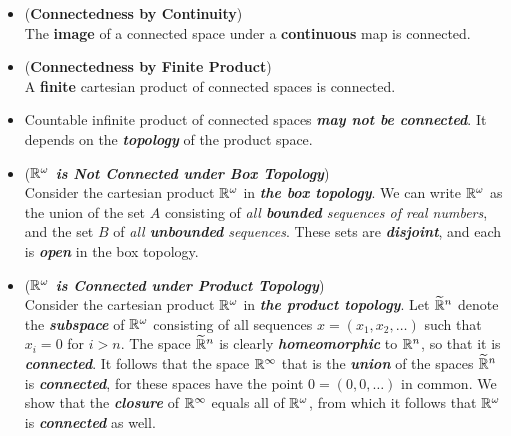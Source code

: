 \documentclass[11pt]{article}
\begin{document}
\begin{itemize}
\item \begin{proposition}  (\textbf{Connectedness by Continuity}) \citep{munkres2000topology} \\
The \textbf{image} of a connected space under a \textbf{continuous} map is connected.
\end{proposition}

\item \begin{proposition}  (\textbf{Connectedness by Finite Product}) \citep{munkres2000topology} \\
A \textbf{finite} cartesian product of connected spaces is connected.
\end{proposition}

\item \begin{remark}
Countable infinite product of connected spaces \emph{\textbf{may not be connected}}. It depends on the \emph{\textbf{topology}} of the product space.
\end{remark}

\item \begin{example} (\emph{\textbf{${\mathbb R}^{\omega}$ is Not Connected under Box Topology}})\\
Consider the cartesian product ${\mathbb R}^{\omega}$ in \emph{\textbf{the box topology}}. We can write ${\mathbb R}^{\omega}$ as the union of the set $A$ consisting of \emph{all \textbf{bounded} sequences of real numbers}, and the set $B$ of \emph{all \textbf{unbounded} sequences}. These sets are \emph{\textbf{disjoint}}, and each is \emph{\textbf{open}} in the box topology.
\end{example}

\item \begin{example} (\emph{\textbf{${\mathbb R}^{\omega}$ is  Connected under Product Topology}})\\
Consider the cartesian product ${\mathbb R}^{\omega}$ in \emph{\textbf{the product topology}}. Let $\widetilde{{\mathbb R}}^n$ denote the \emph{\textbf{subspace}} of ${\mathbb R}^{\omega}$ consisting of all sequences $x = (x_1, x_2, \ldots)$ such that $x_i = 0$ for $i > n$. The space $\widetilde{{\mathbb R}}^n$  is clearly
\emph{\textbf{homeomorphic}} to ${\mathbb R}^n$, so that it is \emph{\textbf{connected}}. It follows that the space ${\mathbb R}^{\infty}$ that is the \emph{\textbf{union}} of the spaces $\widetilde{{\mathbb R}}^n$ is \emph{\textbf{connected}}, for these spaces have the point $0 = (0, 0, \ldots)$ in common.  We show that the \emph{\textbf{closure}} of ${\mathbb R}^{\infty}$ equals all of ${\mathbb R}^{\omega}$, from which it follows that ${\mathbb R}^{\omega}$ is \emph{\textbf{connected}} as well. 
\end{example}



%
\end{itemize}
\end{document}
